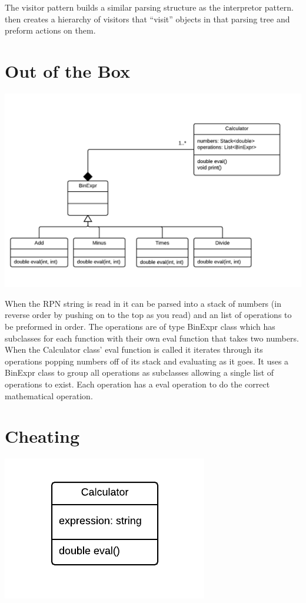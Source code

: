 \documentclass{article}
\begin{document}
The visitor pattern builds a similar parsing structure as the interpretor pattern. then creates a hierarchy of visitors that ``visit'' objects in that parsing tree and preform actions on them.

\newpage
\section*{Out of the Box} %
\label{sec:box}
\includegraphics[width=7in]{rpn.png}

When the RPN string is read in it can be parsed into a stack of numbers (in reverse order by pushing on to the top as you read) and an list of operations to be preformed in order. The operations are of type BinExpr class which has subclasses for each function with their own eval function that takes two numbers. When the Calculator class' eval function is called it iterates through its operations popping numbers off of its stack and evaluating as it goes. It uses a BinExpr class to group all operations as subclasses allowing a single list of operations to exist. Each operation has a eval operation to do the correct mathematical operation.

\newpage
\section*{Cheating} %
\label{sec:cheating}
\includegraphics{cheat.png}
\end{document}
